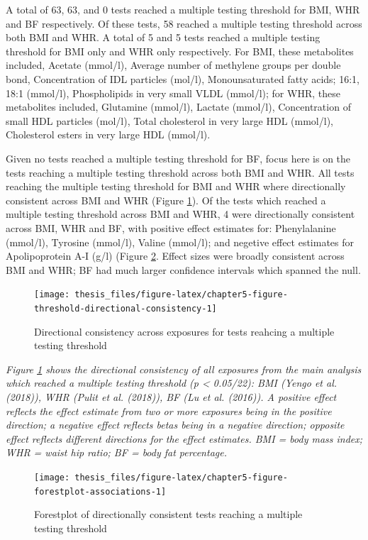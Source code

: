 \documentclass[11pt,twoside]{bristolthesis}
\newcommand{\bsmall}{\begin{small}}
\newcommand{\esmall}{\end{small}}
\begin{document}
A total of 63, 63, and 0 tests reached a multiple testing threshold for BMI, WHR and BF respectively. Of these tests, 58 reached a multiple testing threshold across both BMI and WHR. A total of 5 and 5 tests reached a multiple testing threshold for BMI only and WHR only respectively. For BMI, these metabolites included, Acetate (mmol/l), Average number of methylene groups per double bond, Concentration of IDL particles (mol/l), Monounsaturated fatty acids; 16:1, 18:1 (mmol/l), Phospholipids in very small VLDL (mmol/l); for WHR, these metabolites included, Glutamine (mmol/l), Lactate (mmol/l), Concentration of small HDL particles (mol/l), Total cholesterol in very large HDL (mmol/l), Cholesterol esters in very large HDL (mmol/l).

Given no tests reached a multiple testing threshold for BF, focus here is on the tests reaching a multiple testing threshold across both BMI and WHR. All tests reaching the multiple testing threshold for BMI and WHR where directionally consistent across BMI and WHR (Figure \ref{fig:chapter5-figure-threshold-directional-consistency}). Of the tests which reached a multiple testing threshold across BMI and WHR, 4 were directionally consistent across BMI, WHR and BF, with positive effect estimates for: Phenylalanine (mmol/l), Tyrosine (mmol/l), Valine (mmol/l); and negetive effect estimates for Apolipoprotein A-I (g/l) (Figure \ref{fig:chapter5-figure-forestplot-associations}. Effect sizes were broadly consistent across BMI and WHR; BF had much larger confidence intervals which spanned the null.
\begin{figure}
\texttt{[image: thesis\_files/figure-latex/chapter5-figure-threshold-directional-consistency-1]} \caption{Directional consistency across exposures for tests reahcing a multiple testing threshold}\label{fig:chapter5-figure-threshold-directional-consistency}
\end{figure}
\noindent 
\bsmall
\emph{Figure \ref{fig:chapter5-figure-threshold-directional-consistency} shows the directional consistency of all exposures from the main analysis which reached a multiple testing threshold (p \textless{} 0.05/22): BMI (Yengo et al. (2018)), WHR (Pulit et al. (2018)), BF (Lu et al. (2016)). A positive effect reflects the effect estimate from two or more exposures being in the positive direction; a negative effect reflects betas being in a negative direction; opposite effect reflects different directions for the effect estimates. BMI = body mass index; WHR = waist hip ratio; BF = body fat percentage.}
\esmall
\begin{figure}
\texttt{[image: thesis\_files/figure-latex/chapter5-figure-forestplot-associations-1]} \caption{Forestplot of directionally consistent tests reaching a multiple testing threshold}\label{fig:chapter5-figure-forestplot-associations}
\end{figure}
\end{document}
